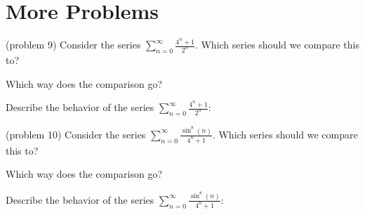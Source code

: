 \documentclass[handout]{ximera}
\begin{document}
\begin{center}
\begin{foldable}
\end{foldable}
\end{center}


\section{More Problems}


\begin{problem}(problem 9)
Consider the series $\displaystyle{\sum_{n=0}^\infty \frac{4^n + 1}{2^n}}$.
Which series should we compare this to?

\begin{multipleChoice}
\end{multipleChoice}

Which way does the comparison go?
\begin{multipleChoice}
\end{multipleChoice}

Describe the behavior of the series $\sum_{n=0}^\infty \frac{4^n + 1}{2^n}:$
\begin{multipleChoice}
\end{multipleChoice}

\end{problem}




\begin{problem}(problem 10)
Consider the series $\displaystyle{\sum_{n=0}^\infty \frac{\sin^8(n)}{4^n + 1}}$.
Which series should we compare this to?

\begin{multipleChoice}
\end{multipleChoice}

Which way does the comparison go?
\begin{multipleChoice}
\end{multipleChoice}

Describe the behavior of the series $\sum_{n=0}^\infty \frac{\sin^8(n)}{4^n + 1}:$
\begin{multipleChoice}
\end{multipleChoice}

\end{problem}
\end{document}
